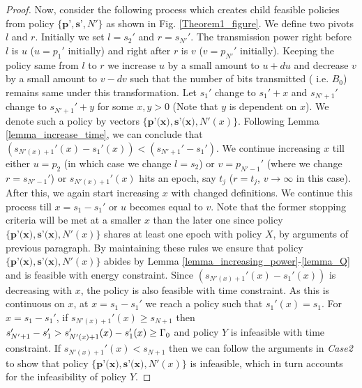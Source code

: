 \begin{proof}
Now, consider the following process which creates child feasible policies from policy $\{\textbf{p'},\textbf{s'},N'\}$ as shown in Fig. \ref{Theorem1_figure}. We define two pivots $l$ and $r$. Initially we set $l=s_2'$ and $r=s_{N'}'$. The transmission power right before $l$ is $u$ ($u=p_1'$ initially) and right after $r$ is $v$ ($v=p_{N'}'$ initially). Keeping the policy same from $l$ to $r$ we increase $u$ by a small amount to $u+du$ and decrease $v$ by a small amount to $v-dv$ such that the number of bits transmitted ( i.e. $B_0$) remains same under this transformation. Let $s_1'$ change to $s_1'+x$ and $s_{N'+1}'$ change to $s_{N'+1}'+y$ for some $x,y>0$ (Note that $y$ is dependent on $x$). We denote such a policy by vectors $\{\textbf{p'(x)},\textbf{s'(x)},N'(x)\}$. Following Lemma \ref{lemma_increase_time}, we can conclude that $(s_{N'(x)+1}'(x)-s_1'(x))<(s_{N'+1}'-s_1')$. We continue increasing $x$ till either $u=p_2$ (in which case we change $l=s_2$) or $v=p_{N'-1}'$ (where we change $r=s_{N'-1}'$) or $s_{N'(x)+1}'(x)$ hits an epoch, say $t_j$ ($r=t_j$, $v\rightarrow\infty$ in this case). After this, we again start increasing $x$ with changed definitions. We continue this process till $x=s_1-s_1'$  or $u$ becomes equal to $v$. Note that the former stopping criteria will be met at a smaller $x$ than the later one since policy $\{\textbf{p'(x)},\textbf{s'(x)},N'(x)\}$ shares at least one epoch with policy $X$, by arguments of previous paragraph. By maintaining these rules we ensure that policy $\{\textbf{p'(x)},\textbf{s'(x)},N'(x)\}$ abides by Lemma \ref{lemma_increasing_power}-\ref{lemma_Q} and is feasible with energy constraint. Since $\left( s_{N'(x)+1}'(x)-s_1'(x)\right)$ is decreasing with $x$, the policy is also feasible with time constraint. As this is continuous on $x$, at $x=s_1-s_1'$ we reach a policy such that $s_1'(x)=s_1$. For $x=s_1-s_1'$, if $s_{N'(x)+1}'(x)\ge s_{N+1}$ then $s_{N'+1}'-s_1'>s_{N'(x)+1}'(x)-s_1'(x)\ge \Gamma_0$ and policy $Y$ is infeasible with time constraint. If $s_{N'(x)+1}'(x)< s_{N+1}$ then we can follow the arguments in \textit{Case2} to show that policy $\{\textbf{p'(x)},\textbf{s'(x)},N'(x)\}$ is infeasible, which in turn accounts for the infeasibility of policy $Y$.
\end{proof}

























